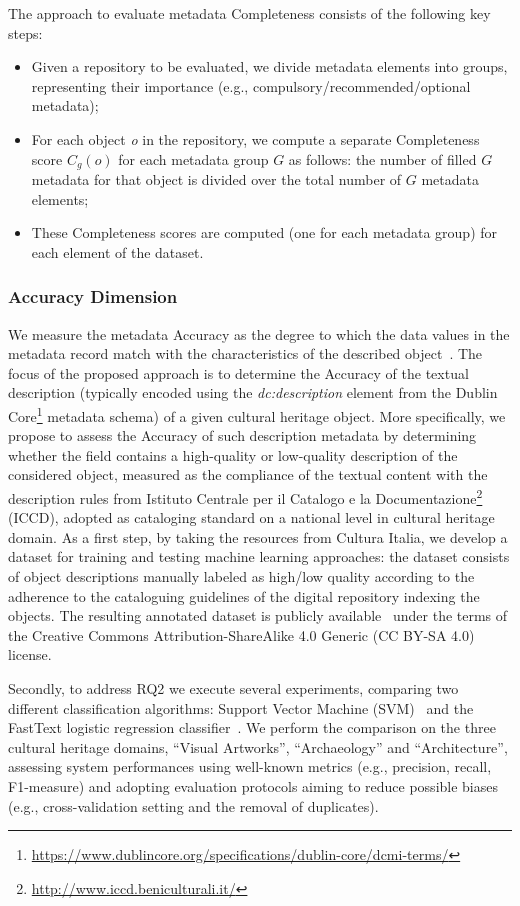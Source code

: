 \documentclass[epsfig,a4paper,12pt,titlepage]{book}
\begin{document}
The approach to evaluate metadata Completeness consists of the following key steps: 
\begin{itemize}
    \item Given a repository to be evaluated, we divide metadata elements into groups, representing their importance (e.g., compulsory/recommended/optional metadata);
    \item For each object \textit{o} in the repository, we compute a separate Completeness score \(C_g(o)\) for each metadata group \(G\) as follows: the number of filled \(G\) metadata for that object is divided over the total number of \(G\) metadata elements;  
    \item These Completeness scores are computed (one for each metadata group) for each element of the dataset.  
\end{itemize}

\subsubsection{Accuracy Dimension}
We measure the metadata Accuracy as the degree to which the data values in the metadata record match with the characteristics of the described object~\cite{20}. The focus of the proposed approach is to determine the Accuracy of the textual description (typically encoded
using the  \textit{dc:description} element from the Dublin Core\footnote{\url{https://www.dublincore.org/specifications/dublin-core/dcmi-terms/}} metadata schema) of a given cultural heritage object. More specifically, we propose to assess the Accuracy of such description metadata by determining whether the field contains a high-quality or low-quality description of the considered object, measured as the compliance of the textual content with the description rules from  Istituto Centrale per il Catalogo e la Documentazione\footnote{\url{http://www.iccd.beniculturali.it/}} (ICCD), adopted as cataloging standard on a national level in cultural heritage domain. 
As a first step, by taking the resources from Cultura Italia, we develop a dataset for  training  and  testing  machine  learning  approaches: the dataset consists of object descriptions manually labeled as  high/low  quality  according to the adherence to the cataloguing guidelines of the digital repository indexing the objects.
 The resulting annotated dataset is publicly available~\cite{dataset} under  the  terms of the  Creative  Commons  Attribution-ShareAlike 4.0 Generic (CC BY-SA 4.0) license.


Secondly, to address RQ2 we execute several experiments, comparing two different classification algorithms: Support Vector Machine (SVM)~\cite{10.1023/A:1022627411411} and the FastText logistic regression classifier~\cite{joulin-etal-2017-bag}. We perform the comparison on the three cultural heritage domains, ``Visual Artworks'', ``Archaeology'' and ``Architecture'', assessing system performances using well-known metrics (e.g., precision, recall, F1-measure) and adopting evaluation protocols aiming to reduce possible biases (e.g., cross-validation setting and the removal of duplicates).
\end{document}

